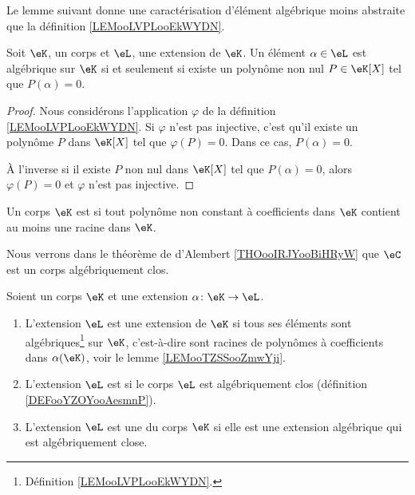 Le lemme suivant donne une caractérisation d'élément algébrique moins abstraite que la définition \ref{LEMooLVPLooEkWYDN}.
\begin{lemma}       \label{LEMooTZSSooZmwYji}
	Soit \( \eK\), un corps et \( \eL\), une extension de \( \eK\). Un élément \( \alpha\in \eL\) est algébrique sur \( \eK\) si et seulement si existe un polynôme non nul \( P\in \eK[X]\) tel que \( P(\alpha)=0\).
\end{lemma}

\begin{proof}
	Nous considérons l'application \( \varphi\) de la définition \ref{LEMooLVPLooEkWYDN}. Si \( \varphi\) n'est pas injective, c'est qu'il existe un polynôme \( P\) dans \( \eK[X]\) tel que \( \varphi(P)=0\). Dans ce cas, \( P(\alpha)=0\).

	À l'inverse si il existe \( P\) non nul dans \( \eK[X]\) tel que \( P(\alpha)=0\), alors \( \varphi(P)=0\) et \( \varphi\) n'est pas injective.
\end{proof}

\begin{definition}      \label{DEFooYZOYooAesmnP}
	Un corps \( \eK\) est  si tout polynôme non constant à coefficients dans \( \eK\) contient au moins une racine dans \( \eK\).
\end{definition}

Nous verrons dans le théorème de d'Alembert \ref{THOooIRJYooBiHRyW} que \( \eC\) est un corps algébriquement clos.

\begin{definition}      \label{DEFooREUHooLVwRuw}
	Soient un corps \( \eK\) et une extension \( \alpha\colon \eK\to \eL\).
	\begin{enumerate}
		\item
		      L'extension \( \eL\) est une extension  de \( \eK\) si tous ses éléments sont algébriques\footnote{Définition \ref{LEMooLVPLooEkWYDN}.} sur \( \eK\), c'est-à-dire sont racines de polynômes à coefficients dans  \(\alpha(\eK)\), voir le lemme \ref{LEMooTZSSooZmwYji}.
		\item       \label{ITEMooEIWVooVjJRoR}
		      L'extension \( \eL\) est  si le corps \( \eL\) est algébriquement clos (définition \ref{DEFooYZOYooAesmnP}).
		\item
		      L'extension \( \eL\) est une  du corps \( \eK\) si elle est une extension algébrique qui est algébriquement close.
	\end{enumerate}
\end{definition}

